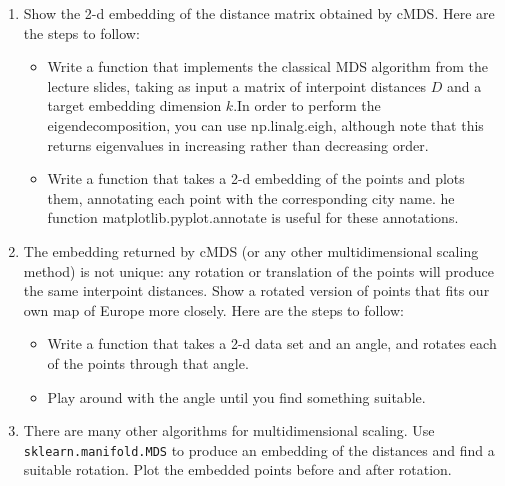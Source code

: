 \documentclass{article}
\begin{document}
\begin{enumerate}
\begin{enumerate}
\item Show the 2-d embedding of the distance matrix obtained by cMDS. Here are the steps to follow:
\begin{itemize}
\item Write a function that implements the classical MDS algorithm from the lecture slides, taking as input a matrix of interpoint distances $D$ and a target embedding dimension $k$.In order
to perform the eigendecomposition, you can use np.linalg.eigh, although note that this
returns eigenvalues in increasing rather than decreasing order.
\item Write a function that takes a 2-d embedding of the points and plots them, annotating each point with the corresponding city name. he function matplotlib.pyplot.annotate is
useful for these annotations.
\end{itemize}

\item The embedding returned by cMDS (or any other multidimensional scaling method) is not unique: any rotation or translation of the points will produce the same interpoint distances. Show a rotated version of points that fits our own map of Europe more closely. Here are the steps to follow:
\begin{itemize}
\item Write a function that takes a 2-d data set and an angle, and rotates each of the points through that angle.
\item Play around with the angle until you find something suitable.
\end{itemize}

\item There are many other algorithms for multidimensional scaling. Use \texttt{sklearn.manifold.MDS} to produce an embedding of the distances and find a suitable rotation. Plot the embedded points before and after rotation.
\end{enumerate}
\end{enumerate}
\end{document}
